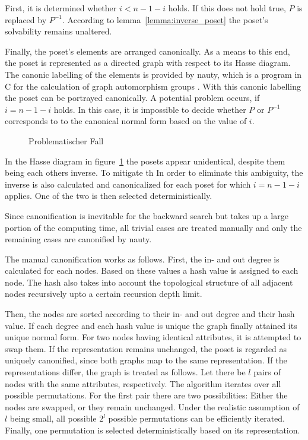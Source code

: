 \documentclass[10pt,journal,compsoc]{IEEEtran}
\begin{document}
First, it is determined whether $i < n-1-i$ holds.
If this does not hold true, $P$ is replaced by $P^{-1}$.
According to lemma~\ref{lemma:inverse_poset} the poset's solvability remains unaltered.

Finally, the poset's elements are arranged canonically.
As a means to this end, the poset is represented as a directed graph with respect to its Hasse diagram.
The canonic labelling of the elements is provided by nauty, which is a program in C for the calculation of graph automorphism groups \cite{MCKAY201494}.
With this canonic labelling the poset can be portrayed canonically.
A potential problem occurs, if $i = n - 1 - i$ holds.
In this case, it is impossible to decide whether $P$ or $P^{-1}$ corresponds to
to the canonical normal form based on the value of $i$.

\begin{figure}
  
  \centering
  \caption{Problematischer Fall}
  \label{fig:backward_canonify_problematic}
\end{figure}

In the Hasse diagram in figure~\ref{fig:backward_canonify_problematic} the posets appear unidentical, despite them being each others inverse.
To mitigate th
In order to eliminate this ambiguity, the inverse is also calculated and canonicalized for each poset for which $i = n - 1 - i$ applies.
One of the two is then selected deterministically.

Since canonification is inevitable for the backward search but takes up a large portion of the computing time, all trivial cases are treated manually and only the remaining cases are canonified by nauty.

The manual canonification works as follows.
First, the in- and out degree is calculated for each nodes.
Based on these values a hash value is assigned to each node.
The hash also takes into account the topological structure of all adjacent nodes recursively upto a certain recursion depth limit.

Then, the nodes are sorted according to their in- and out degree and their hash value.
If each degree and each hash value is unique the graph finally attained its unique normal form.
For two nodes having identical attributes, it is attempted to swap them.
If the representation remains unchanged, the poset is regarded as uniquely canonified, since both graphs map to the same representation.
If the representations differ, the graph is treated as follows.
Let there be $l$ pairs of nodes with the same attributes, respectively.
The algorithm iterates over all possible permutations.
For the first pair there are two possibilities: Either the nodes are swapped, or they remain unchanged.
Under the realistic assumption of $l$ being small, all possible $2^l$ possible permutations can be efficiently iterated.
Finally, one permutation is selected deterministically based on its representation.
\end{document}

